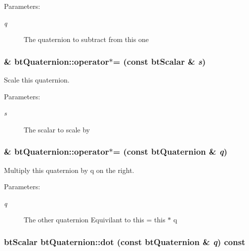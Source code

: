 \begin{Desc}
\item[Parameters:]
\begin{description}
\item[{\em q}]The quaternion to subtract from this one \end{description}
\end{Desc}
\hypertarget{classbt_quaternion_bd260487e98defbd77618f04d51fcc92}{
\subsubsection[operator$\ast$=]{\& btQuaternion::operator$\ast$= (const btScalar \& {\em s})}}
\label{classbt_quaternion_bd260487e98defbd77618f04d51fcc92}


Scale this quaternion. 

\begin{Desc}
\item[Parameters:]
\begin{description}
\item[{\em s}]The scalar to scale by \end{description}
\end{Desc}
\hypertarget{classbt_quaternion_bfc6dee30a6f56e69343a31368713f95}{
\subsubsection[operator$\ast$=]{\& btQuaternion::operator$\ast$= (const {\bf btQuaternion} \& {\em q})}}
\label{classbt_quaternion_bfc6dee30a6f56e69343a31368713f95}


Multiply this quaternion by q on the right. 

\begin{Desc}
\item[Parameters:]
\begin{description}
\item[{\em q}]The other quaternion Equivilant to this = this $\ast$ q \end{description}
\end{Desc}
\hypertarget{classbt_quaternion_37e450f3206a7b6f3f55049e297fb403}{
\subsubsection[dot]{\setlength{\rightskip}{0pt plus 5cm}btScalar btQuaternion::dot (const {\bf btQuaternion} \& {\em q}) const}}
\label{classbt_quaternion_37e450f3206a7b6f3f55049e297fb403}


